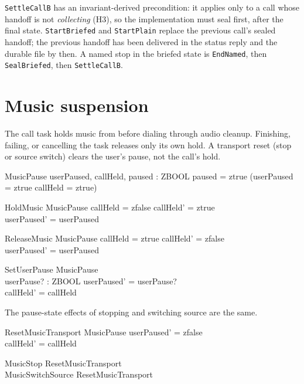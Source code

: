 \documentclass[a4paper,10pt,fleqn]{article}
\begin{document}
\texttt{SettleCallB} has an invariant-derived precondition: it applies
only to a call whose handoff is not \emph{collecting} (H3), so the
implementation must seal first, after the final state. \texttt{StartBriefed} and
\texttt{StartPlain} replace the previous call's sealed handoff; the
previous handoff has been delivered in the status reply and the durable
file by then. A named stop in the briefed state is
\texttt{EndNamed}, then \texttt{SealBriefed}, then \texttt{SettleCallB}.

\section{Music suspension}

The call task holds music from before dialing through audio cleanup. Finishing,
failing, or cancelling the task releases only its own hold. A transport reset
(stop or source switch) clears the user's pause, not the call's hold.

\begin{schema}{MusicPause}
  userPaused, callHeld, paused : ZBOOL
\where
  paused = ztrue \iff (userPaused = ztrue \lor callHeld = ztrue)
\end{schema}

\begin{schema}{HoldMusic}
  \Delta MusicPause
\where
  callHeld = zfalse \land callHeld' = ztrue \\
  userPaused' = userPaused
\end{schema}

\begin{schema}{ReleaseMusic}
  \Delta MusicPause
\where
  callHeld = ztrue \land callHeld' = zfalse \\
  userPaused' = userPaused
\end{schema}

\begin{schema}{SetUserPause}
  \Delta MusicPause \\
  userPause? : ZBOOL
\where
  userPaused' = userPause? \\
  callHeld' = callHeld
\end{schema}

The pause-state effects of stopping and switching source are the same.

\begin{schema}{ResetMusicTransport}
  \Delta MusicPause
\where
  userPaused' = zfalse \\
  callHeld' = callHeld
\end{schema}

\begin{zed}
  MusicStop  ResetMusicTransport \\
  MusicSwitchSource  ResetMusicTransport
\end{zed}
\end{document}

